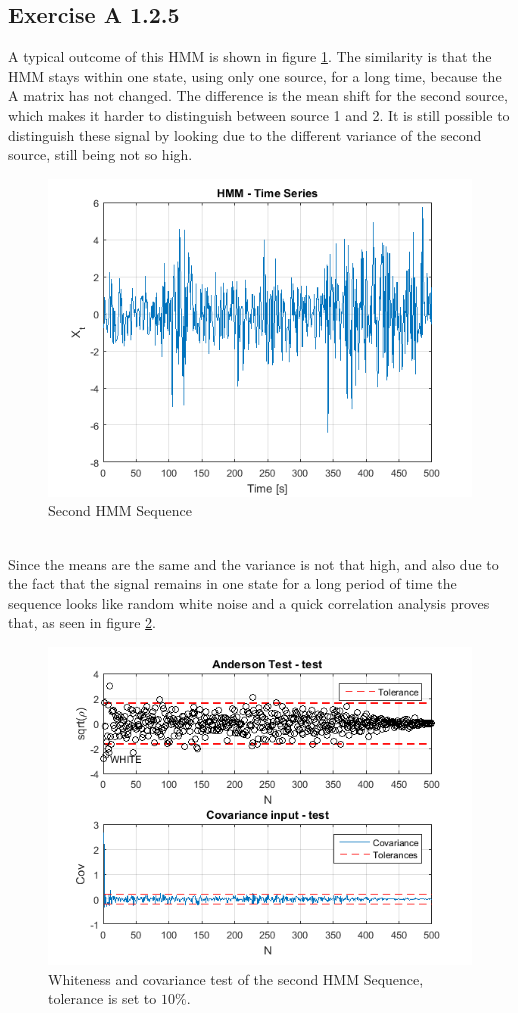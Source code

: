 \documentclass[10pt,a4paper,final]{article}
\begin{document}
\subsection{Exercise A 1.2.5}
A typical outcome of this HMM is shown in figure \ref{fig:A3}. The similarity is that the HMM stays within one state, using only one source, for a long time, because the A matrix has not changed. The difference is the mean shift for the second source, which makes it harder to distinguish between source 1 and 2. It is still possible to distinguish these signal by looking due to the different variance of the second source, still being not so high.
\begin{figure}[h]
		\centering
		\includegraphics[width=0.55\linewidth]{./images/A3.png}
		\caption{Second HMM Sequence}
		\label{fig:A3}	
\end{figure}\\
Since the means are the same and the variance is not that high, and also due to the fact that the signal remains in one state for a long period of time the sequence looks like random white noise and a quick correlation analysis proves that, as seen in figure \ref{fig:A4}.
\begin{figure}[h]
		\centering
		\includegraphics[width=0.55\linewidth]{./images/A4.png}
		\caption{Whiteness and covariance test of the second HMM Sequence, tolerance is set to $10\%$.}
		\label{fig:A4}	
\end{figure}
\newpage
\end{document}
